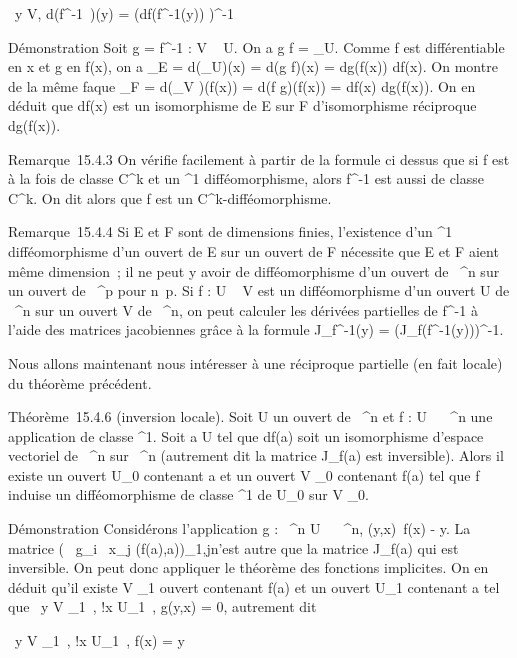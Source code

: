 \documentclass[]{article}
\begin{document}
\forall~y \in V, d(f^-1~)(y) =
\left (df(f^-1(y))\right
)^-1

Démonstration Soit g = f^-1 : V \rightarrow~ U. On a g \cdot f =
\mathrmId_U. Comme f est différentiable en x
et g en f(x), on a \mathrmId_E =
d(\mathrmId_U)(x) = d(g \cdot f)(x) = dg(f(x)) \cdot
df(x). On montre de la même fa\ccon que
\mathrmId_F =
d(\mathrmId_V )(f(x)) = d(f \cdot g)(f(x)) =
df(x) \cdot dg(f(x)). On en déduit que df(x) est un isomorphisme de E sur F
d'isomorphisme réciproque dg(f(x)).

Remarque~15.4.3 On vérifie facilement à partir de la formule ci dessus
que si f est à la fois de classe C^k et un ^1
difféomorphisme, alors f^-1 est aussi de classe
C^k. On dit alors que f est un
C^k-difféomorphisme.

Remarque~15.4.4 Si E et F sont de dimensions finies, l'existence d'un
^1 difféomorphisme d'un ouvert de E sur un ouvert de F
nécessite que E et F aient même dimension~; il ne peut y avoir de
difféomorphisme d'un ouvert de ~^n sur un ouvert de
~^p pour n\neq~p. Si f : U \rightarrow~ V est un
difféomorphisme d'un ouvert U de ~^n sur un ouvert V de
~^n, on peut calculer les dérivées partielles de
f^-1 à l'aide des matrices jacobiennes grâce à la formule
J_f^-1(y) = \left
(J_f(f^-1(y))\right )^-1.

Nous allons maintenant nous intéresser à une réciproque partielle (en
fait locale) du théorème précédent.

Théorème~15.4.6 (inversion locale). Soit U un ouvert de ~^n
et f : U \rightarrow~ ~^n une application de classe ^1. Soit
a \in U tel que df(a) soit un isomorphisme d'espace vectoriel de
~^n sur ~^n (autrement dit la matrice
J_f(a) est inversible). Alors il existe un ouvert U_0
contenant a et un ouvert V _0 contenant f(a) tel que f induise
un difféomorphisme de classe ^1 de U_0 sur V
_0.

Démonstration Considérons l'application g : ~^n \times U \rightarrow~
~^n, (y,x)\mapsto~f(x) - y. La matrice
\left ( \partial~g_i \over
\partial~x_j (f(a),a)\right )_1\leqi,j\leqn n'est
autre que la matrice J_f(a) qui est inversible. On peut donc
appliquer le théorème des fonctions implicites. On en déduit qu'il
existe V _1 ouvert contenant f(a) et un ouvert U_1
contenant a tel que \forall~y \in V _1~,
\exists!x \in U_1~, g(y,x) = 0, autrement dit

\forall~y \in V _1~,
\exists!x \in U_1~, f(x) = y
\end{document}
